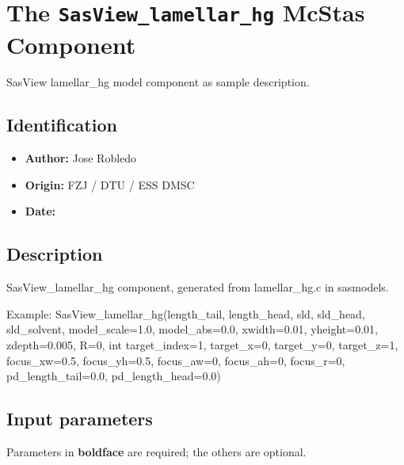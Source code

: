 \section{The \texttt{SasView\_lamellar\_hg} McStas Component}
SasView lamellar\_hg model component as sample description.

\subsection*{Identification}
\begin{itemize}
  \item \textbf{Author:} Jose Robledo
  \item \textbf{Origin:} FZJ / DTU / ESS DMSC
  \item \textbf{Date:} 
\end{itemize}

\subsection*{Description}
SasView\_lamellar\_hg component, generated from lamellar\_hg.c in sasmodels.

Example: SasView\_lamellar\_hg(length\_tail, length\_head, sld, sld\_head, sld\_solvent, model\_scale=1.0, model\_abs=0.0, xwidth=0.01, yheight=0.01, zdepth=0.005, R=0, int target\_index=1, target\_x=0, target\_y=0, target\_z=1, focus\_xw=0.5, focus\_yh=0.5, focus\_aw=0, focus\_ah=0, focus\_r=0, pd\_length\_tail=0.0, pd\_length\_head=0.0)

\subsection*{Input parameters}
Parameters in \textbf{boldface} are required; the others are optional.

